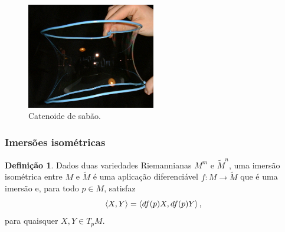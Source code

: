 \documentclass[12pt,a4paper]{beamer}
\theoremstyle{definition}
\newtheorem{definicao}{Definição}
\begin{document}
\begin{frame}	
	
	\begin{figure}
		\centering
		\includegraphics[width=0.5\textwidth]{images/soap-catenoid}
		\caption{Catenoide de sabão.}
	\end{figure}
	
\end{frame}

\begin{frame}
	\frametitle{Imersões isométricas}
	
	\begin{definicao}
		Dados duas variedades Riemannianas $M^m$ e $\tilde{M}^n$, uma \alert{imersão isométrica} entre $M$ e
		$\tilde{M}$ é uma aplicação diferenciável $f : M \rightarrow \tilde{M}$ que é uma imersão e, para todo $p \in M$, satisfaz
		\begin{equation*}
			\left\langle X,Y \right\rangle = \left\langle df(p) X,df(p) Y \right\rangle,
		\end{equation*}
		para quaisquer $X,Y \in T_p M$.
	\end{definicao}

\end{frame}
\end{document}
